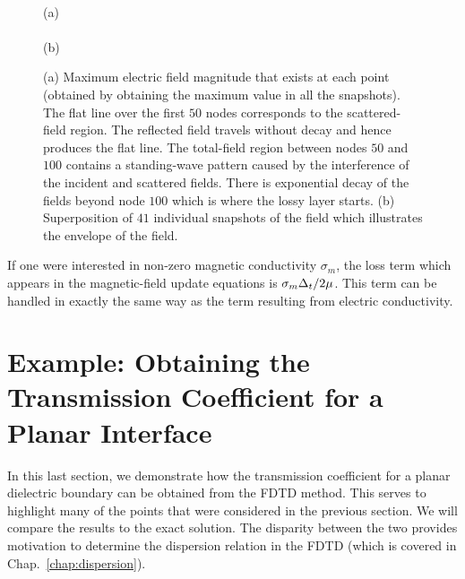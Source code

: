 \begin{figure}
  \begin{center}
   \\
  (a) \\ \vspace{.2in}
  \\ (b) \end{center} \caption{(a) Maximum electric field magnitude
  that exists at each point (obtained by obtaining the maximum value
  in all the snapshots).  The flat line over the first $50$ nodes
  corresponds to the scattered-field region.  The reflected field
  travels without decay and hence produces the flat line.  The
  total-field region between nodes $50$ and $100$ contains a
  standing-wave pattern caused by the interference of the incident and
  scattered fields.  There is exponential decay of the fields beyond
  node $100$ which is where the lossy layer starts.  (b) Superposition
  of $41$ individual snapshots of the field which illustrates the
  envelope of the field.}  \label{fig:decayDemo}
\end{figure}


If one were interested in non-zero magnetic conductivity $\sigma_m$,
the loss term which appears in the magnetic-field update equations is
$\sigma_m\Delta_t/2\mu$.  This term can be handled in exactly the same
way as the term resulting from electric conductivity.  


\section[Transmission Coefficient for a Planar Interface]%
{Example:  Obtaining the Transmission Coefficient for a Planar
Interface \label{sec:specExampleTrans}}

In this last section, we demonstrate how the transmission coefficient
for a planar dielectric boundary can be obtained from the FDTD method.
This serves to highlight many of the points that were considered in
the previous section.  We will compare the results to the exact
solution.  The disparity between the two provides motivation to
determine the dispersion relation in the FDTD (which is covered in
Chap.\ \ref{chap:dispersion}).

